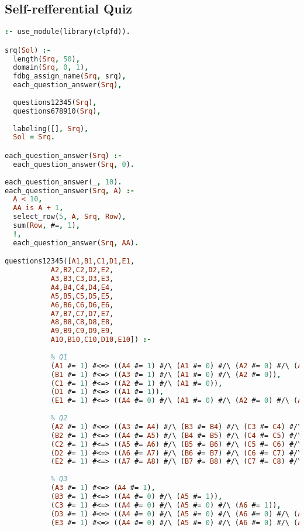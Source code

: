 \subsection{Self-refferential Quiz}
\label{implementation:sicstus:srq}
\begin{lstlisting}[language=Prolog]
:- use_module(library(clpfd)).

srq(Sol) :-
  length(Srq, 50),
  domain(Srq, 0, 1),
  fdbg_assign_name(Srq, srq),
  each_question_answer(Srq),
  
  questions12345(Srq),
  questions678910(Srq),
  
  labeling([], Srq),
  Sol = Srq.

each_question_answer(Srq) :-
  each_question_answer(Srq, 0).
  
each_question_answer(_, 10).
each_question_answer(Srq, A) :-
  A < 10,
  AA is A + 1,
  select_row(5, A, Srq, Row),
  sum(Row, #=, 1),
  !,
  each_question_answer(Srq, AA).

questions12345([A1,B1,C1,D1,E1,
           A2,B2,C2,D2,E2,
           A3,B3,C3,D3,E3,
           A4,B4,C4,D4,E4,
           A5,B5,C5,D5,E5,
           A6,B6,C6,D6,E6,
           A7,B7,C7,D7,E7,
           A8,B8,C8,D8,E8,
           A9,B9,C9,D9,E9,
           A10,B10,C10,D10,E10]) :-
           
           % Q1
           (A1 #= 1) #<=> ((A4 #= 1) #/\ (A1 #= 0) #/\ (A2 #= 0) #/\ (A3 #= 0)),
           (B1 #= 1) #<=> ((A3 #= 1) #/\ (A1 #= 0) #/\ (A2 #= 0)),
           (C1 #= 1) #<=> ((A2 #= 1) #/\ (A1 #= 0)),
           (D1 #= 1) #<=> ((A1 #= 1)),
           (E1 #= 1) #<=> ((A4 #= 0) #/\ (A1 #= 0) #/\ (A2 #= 0) #/\ (A3 #= 0)),
           
           % Q2
           (A2 #= 1) #<=> ((A3 #= A4) #/\ (B3 #= B4) #/\ (C3 #= C4) #/\ (D3 #= D4) #/\ (E3 #= E4)),
           (B2 #= 1) #<=> ((A4 #= A5) #/\ (B4 #= B5) #/\ (C4 #= C5) #/\ (D4 #= D5) #/\ (E4 #= E5)),
           (C2 #= 1) #<=> ((A5 #= A6) #/\ (B5 #= B6) #/\ (C5 #= C6) #/\ (D5 #= D6) #/\ (E5 #= E6)),
           (D2 #= 1) #<=> ((A6 #= A7) #/\ (B6 #= B7) #/\ (C6 #= C7) #/\ (D6 #= D7) #/\ (E6 #= E7)),
           (E2 #= 1) #<=> ((A7 #= A8) #/\ (B7 #= B8) #/\ (C7 #= C8) #/\ (D7 #= D8) #/\ (E7 #= E8)),
           
           % Q3
           (A3 #= 1) #<=> (A4 #= 1),
           (B3 #= 1) #<=> ((A4 #= 0) #/\ (A5 #= 1)),
           (C3 #= 1) #<=> ((A4 #= 0) #/\ (A5 #= 0) #/\ (A6 #= 1)),
           (D3 #= 1) #<=> ((A4 #= 0) #/\ (A5 #= 0) #/\ (A6 #= 0) #/\ (A7 #= 1)),
           (E3 #= 1) #<=> ((A4 #= 0) #/\ (A5 #= 0) #/\ (A6 #= 0) #/\ (A7 #= 0) #/\ (A8 #= 1)),
           

\end{lstlisting}
